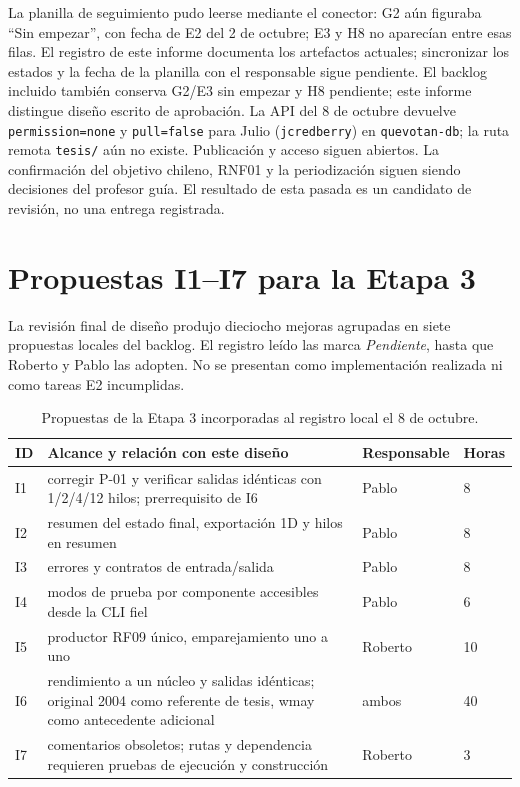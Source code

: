 La planilla de seguimiento pudo leerse mediante el conector: G2 aún figuraba ``Sin empezar'',
con fecha de E2 del 2 de octubre; E3 y H8 no aparecían entre esas filas. El registro de este
informe documenta los artefactos actuales; sincronizar los estados y la fecha de la planilla
con el responsable sigue pendiente. El backlog incluido también conserva G2/E3 sin empezar y H8
pendiente; este informe distingue diseño escrito de aprobación. La API del 8 de octubre devuelve
\texttt{permission=none} y \texttt{pull=false} para Julio (\texttt{jcredberry}) en
\texttt{quevotan-db}; la ruta remota \texttt{tesis/} aún no existe. Publicación y acceso siguen abiertos.
La confirmación del objetivo chileno, RNF01 y la periodización siguen siendo decisiones del
profesor guía. El resultado de esta pasada es un candidato de revisión, no una entrega registrada.


\section*{Propuestas I1--I7 para la Etapa 3}

La revisión final de diseño produjo dieciocho mejoras agrupadas en siete propuestas locales
del backlog. El registro leído las marca \emph{Pendiente}, hasta que Roberto y Pablo las
adopten. No se presentan como implementación realizada ni como tareas E2 incumplidas.

\begin{table}[htbp]
\centering\footnotesize
\caption{Propuestas de la Etapa 3 incorporadas al registro local el 8 de octubre.}
\begin{tabular}{L{0.7cm}L{7.9cm}L{2.0cm}L{1.0cm}}
\toprule
ID & Alcance y relación con este diseño & Responsable & Horas \\
\midrule
I1 & corregir P-01 y verificar salidas idénticas con 1/2/4/12 hilos; prerrequisito de I6 & Pablo & 8 \\
I2 & resumen del estado final, exportación 1D y hilos en resumen & Pablo & 8 \\
I3 & errores y contratos de entrada/salida & Pablo & 8 \\
I4 & modos de prueba por componente accesibles desde la CLI fiel & Pablo & 6 \\
I5 & productor RF09 único, emparejamiento uno a uno & Roberto & 10 \\
I6 & rendimiento a un núcleo y salidas idénticas; original 2004 como referente de tesis,
wmay como antecedente adicional & ambos & 40 \\
I7 & comentarios obsoletos; rutas y dependencia requieren pruebas de ejecución y construcción & Roberto & 3 \\
\bottomrule
\end{tabular}
\end{table}

